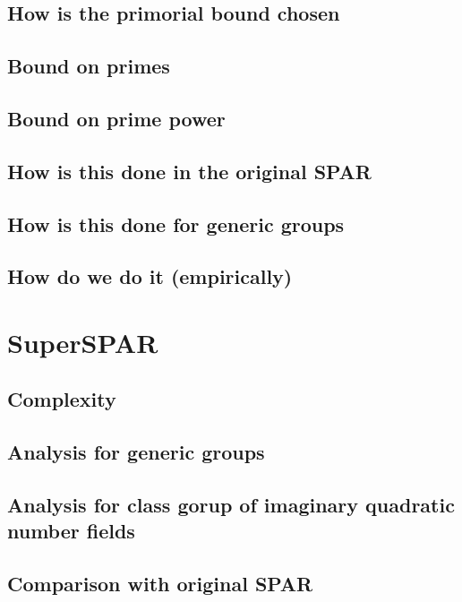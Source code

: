 \documentclass{ucalgthes1}
\theoremstyle{plain}
\theoremstyle{definition}
\begin{document}
\subsection{How is the primorial bound chosen}

\subsection{Bound on primes}

\subsection{Bound on prime power}

\subsection{How is this done in the original SPAR}

\subsection{How is this done for generic groups}

\subsection{How do we do it (empirically)}


\section{SuperSPAR}

\subsection{Complexity}
\subsection{Analysis for generic groups}
\subsection{Analysis for class gorup of imaginary quadratic number fields}
\subsection{Comparison with original SPAR}
\end{document}
